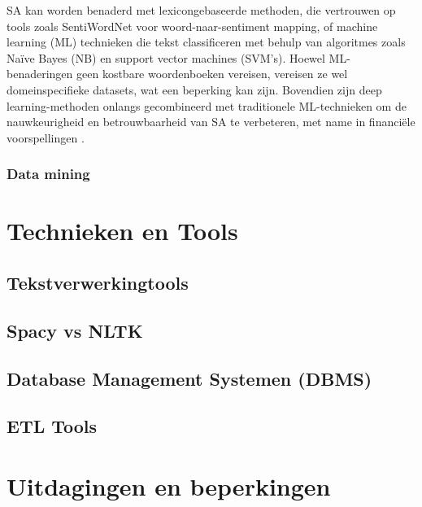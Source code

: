 SA kan worden benaderd met lexicongebaseerde methoden, die vertrouwen op tools zoals SentiWordNet voor woord-naar-sentiment mapping, of machine learning (ML) technieken die tekst classificeren met behulp van algoritmes zoals Naïve Bayes (NB) en support vector machines (SVM's). Hoewel ML-benaderingen geen kostbare woordenboeken vereisen, vereisen ze wel domeinspecifieke datasets, wat een beperking kan zijn. Bovendien zijn deep learning-methoden onlangs gecombineerd met traditionele ML-technieken om de nauwkeurigheid en betrouwbaarheid van SA te verbeteren, met name in financiële voorspellingen \autocite{Gupta2020}.

\subsubsection{Data mining}
















\section{Technieken en Tools}
\subsection{Tekstverwerkingtools}
\subsection{Spacy vs NLTK}

\subsection{Database Management Systemen (DBMS)}
\subsection{ETL Tools}



\section{Uitdagingen en beperkingen}
